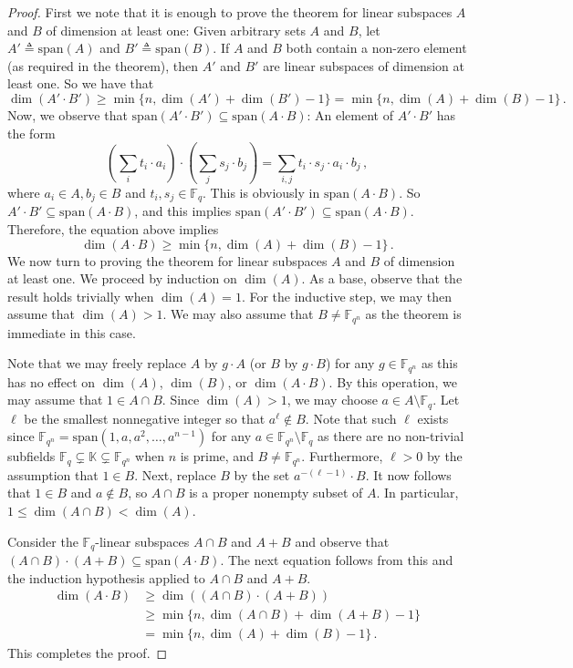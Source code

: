 \documentclass[10pt]{article}
\theoremstyle{definition}
\numberwithin{equation}{section}
\newcommand{\spn}{\textrm{span}}
\newcommand{\F}{\mathbb F_q}
\newcommand{\Fn}{\mathbb F_{q^n}}
\begin{document}
\begin{proof}
First we note that it is enough to prove the theorem for linear subspaces $A$ and
$B$ of dimension at least one:
Given arbitrary sets $A$ and $B$, let $A'\triangleq\spn(A)$ and $B'\triangleq\spn(B)$.
If $A$ and $B$ both contain a non-zero element (as required in the theorem), then $A'$ and $B'$ are linear subspaces
of dimension at least one. So we have that
\[\dim(A'\cdot B')\geq \min\{n,\dim(A')+\dim(B') -1\} = \min\{n,\dim(A)+\dim(B) -1 \}\,.\]
Now, we observe that $\spn(A'\cdot B')\subseteq \spn(A\cdot B)$: An element of $A' \cdot B'$ has the
form
\[(\sum_i t_i\cdot a_i )\cdot( \sum_j s_j\cdot b_j)=\sum_{i,j} t_i\cdot s_j\cdot a_i\cdot b_j\,,\]
where $a_i\in A,b_j\in B$ and $t_i,s_j\in \F$. This is obviously in $\spn(A\cdot B)$.
So $A'\cdot B'\subseteq \spn(A\cdot B)$, and this implies $\spn(A'\cdot B')\subseteq \spn(A\cdot B)$.
Therefore, the equation above implies
\[\dim(A\cdot B)\geq \min\{n,\dim(A)+\dim(B) -1 \}\,.\]
We now turn to proving the theorem for linear subspaces $A$ and $B$ of dimension at least one.
We proceed by induction on $\dim(A)$.  As a base, observe that the
result holds trivially when $\dim(A) = 1$.  For the inductive step, we
may then assume that $\dim(A) >1$.  We may also assume that $B \neq
\Fn$ as the theorem is immediate in this case.

Note that we may freely replace $A$ by $g\cdot A$ (or $B$ by
$g\cdot B$) for any $g \in \Fn$ as this has no effect on $\dim(A)$, $\dim(B)$, or
$\dim(A \cdot B)$.  By this operation, we may assume that $1 \in A \cap
B$.
Since $\dim(A) > 1$, we may choose $a \in A \setminus \F$.  Let $\ell$ be the
smallest nonnegative integer so that $a^{\ell} \not\in B$. Note that such $\ell$ exists
since $\Fn = \spn(1,a,a^2,\ldots,a^{n-1})$ for any $a \in \Fn \setminus \F$
as there are no non-trivial subfields $\F\subsetneq \mathbb{K} \subsetneq \Fn$ when $n$ is prime, and  $B \neq \Fn$. Furthermore, $\ell > 0$ by the assumption that $1 \in B$.  Next, replace $B$
by the set $a^{-(\ell -  1)}\cdot B$.  It now follows that $1 \in B$ and $a
\not\in B$, so $A \cap B$ is a proper nonempty subset of $A$.
In particular, $1\leq \dim(A\cap B) < \dim(A)$.


Consider the $\F$-linear subspaces $A \cap B$ and $A+B$ and observe
that $(A \cap B) \cdot (A + B) \subseteq \spn(A \cdot B)$.
 The next
equation follows from this and the induction hypothesis applied to $A \cap B$ and $A
+B$.
\begin{align*}
 \dim(A\cdot B) &\ge \dim( (A \cap B) \cdot (A + B)) \\
 &\ge \min\{n,\dim(A\cap B)+\dim(A+B) -1\} \\
 &= \min\{n,\dim(A) + \dim(B) - 1\}\,.
\end{align*}
This completes the proof.
\end{proof}
\end{document}
